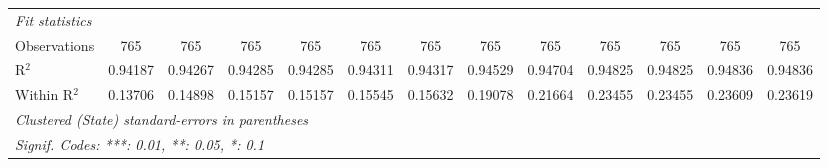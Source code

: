 \begin{tabular}{lcccccccccccc}
   \midrule
   \emph{Fit statistics}\\
   Observations          & 765            & 765            & 765             & 765             & 765             & 765             & 765                     & 765                     & 765                    & 765                    & 765                     & 765\\  
   R$^2$                 & 0.94187        & 0.94267        & 0.94285         & 0.94285         & 0.94311         & 0.94317         & 0.94529                 & 0.94704                 & 0.94825                & 0.94825                & 0.94836                 & 0.94836\\  
   Within R$^2$          & 0.13706        & 0.14898        & 0.15157         & 0.15157         & 0.15545         & 0.15632         & 0.19078                 & 0.21664                 & 0.23455                & 0.23455                & 0.23609                 & 0.23619\\  
   \midrule \midrule
   \multicolumn{13}{l}{\emph{Clustered (State) standard-errors in parentheses}}\\
   \multicolumn{13}{l}{\emph{Signif. Codes: ***: 0.01, **: 0.05, *: 0.1}}\\
\end{tabular}
\par\endgroup




